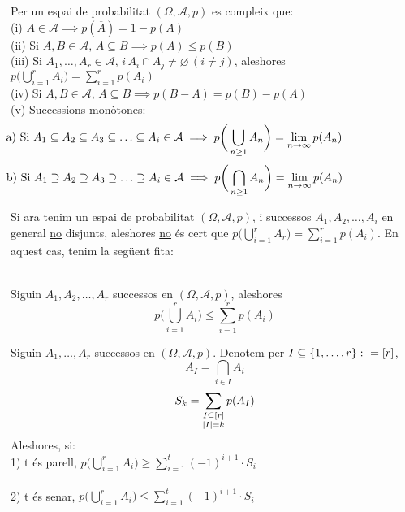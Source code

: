 \begin{prop}
  Per un espai de probabilitat $(\Omega, \mathcal{A}, p)$ es compleix que: \\
  (i) $A\in\mathcal{A} \implies p(\overline{A}) = 1-p(A)$ \\
  (ii) Si $A, B \in \mathcal{A},\, A \subseteq B \implies p(A)\leq p(B)$ \\
  (iii) Si $A_{1},\ldots,A_{r} \in \mathcal{A}, \, i \, A_{i}\cap A_{j} \not= \varnothing \, (i\not= j)$, 
  aleshores $p\bigg(\bigcup\limits_{i=1}^{r}A_{i} \bigg) = \sum\limits_{i=1}^{r}p(A_{i})$ \\
  (iv) Si $A,B \in \mathcal{A}, \, A\subseteq B \implies p(B-A) = p(B)-p(A)$\\
  (v) Successions monòtones: 
  \[
    \hspace{-2.5cm}\text{a) Si } A_{1} \subseteq A_{2} \subseteq A_{3} \subseteq \ldots \subseteq A_{i} \in \mathcal{A} 
    \implies p\bigg(\bigcup\limits_{n\geq1}A_{n}\bigg) = \lim_{n\to\infty}p(A_{n})
  \]
  \[
    \hspace{-2.5cm}\text{b) Si } A_{1} \supseteq A_{2} \supseteq A_{3} \supseteq \ldots \supseteq A_{i} \in \mathcal{A} 
    \implies p\bigg(\bigcap\limits_{n\geq1}A_{n}\bigg) = \lim_{n\to\infty}p(A_{n})
  \]
\end{prop}

\newpage

Si ara tenim un espai de probabilitat $(\Omega, \mathcal{A},p)$, i successos $A_{1}, A_{2}, \ldots, A_{i}$ 
en general \underline{no} disjunts, aleshores \underline{no} és cert que  $p\bigg(\bigcup\limits_{i=1}^{r}A_{r} \bigg) 
= \sum\limits_{i=1}^{r}p(A_{i})$. En aquest cas, tenim la següent fita:
\begin{lema} \-\\
  Siguin $A_{1}, A_{2}, \ldots, A_{r}$ successos en $(\Omega, \mathcal{A},p)$, aleshores 
  $$p\bigg(\bigcup\limits_{i=1}^{r}A_{i} \bigg) \leq \sum\limits_{i=1}^{r}p(A_{i})$$
\end{lema}

\begin{thm}
  Siguin $A_{1}, \ldots, A_{r}$ successos en $(\Omega, \mathcal{A}, p)$. 
  Denotem per $I\subseteq \left\{1,\ldots,r\right\} \colon = [r]$, \\
  \[
    A_{I} = \bigcap\limits_{i\in I}A_{i}
  \]
  \[
    S_{k} = \sum_{\substack{I\subseteq[r] \\ \left\vert I \right\vert=k}}p(A_{I})
  \]
  Aleshores, si: \\
  1) t és parell, $p\bigg(\bigcup\limits_{i=1}^{r} A_{i}\bigg)\geq \sum\limits_{i=1}^{t}(-1)^{i+1}\cdot S_{i}$\\\\
  2) t és senar, $p\bigg(\bigcup\limits_{i=1}^{r} A_{i}\bigg)\leq \sum\limits_{i=1}^{t}(-1)^{i+1}\cdot S_{i}$
\end{thm}

